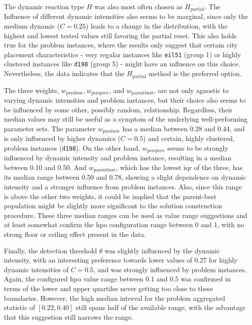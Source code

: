 The dynamic reaction type $H$ was also most often chosen as $H_\text{partial}$. The Influence of different dynamic intensities also seems to be marginal, since only the medium dynamic ($C=0.25$) leads to a change in the distribution, with the highest and lowest tested values still favoring the partial reset. This also holds true for the problem instances, where the results only suggest that certain city placement characteristics - very regular instances like \texttt{eil51} (group 1) or highly clustered instances like \texttt{d198} (group 5) - might have an influence on this choice. Nevertheless, the data indicates that the $H_\text{partial}$ method is the preferred option.

The three weights, $w_{\text{persbest}}, w_{\text{persprev}}$, and $w_{\text{parentbest}}$, are not only agnostic to varying dynamic intensities and problem instances, but their choice also seems to be influenced by some other, possibly random, relationship. Regardless, their median values may still be useful as a symptom of the underlying well-performing parameter sets. The parameter $w_{\text{persbest}}$ has a median between 0.28 and 0.44, and is only influenced by higher dynamics ($C=0.5$) and certain, highly clustered, problem instances (\texttt{d198}). On the other hand, $w_{\text{persprev}}$ seems to be strongly influenced by dynamic intensity and problem instance, resulting in a median between 0.10 and 0.50. And $w_{\text{parentbest}}$, which has the lowest \gls{iqr} of the three, has its median range between 0.50 and 0.78, showing a slight dependence on dynamic intensity and a stronger influence from problem instances. Also, since this range is above the other two weights, it could be implied that the parent-best population might be slightly more significant to the solution construction procedure. These three median ranges can be used as value range suggestions and at least somewhat confirm the \gls{hpo} configuration range between 0 and 1, with no strong floor or ceiling effect present in the data.  

Finally, the detection threshold $\theta$ was slightly influenced by the dynamic intensity, with an interesting preference towards lower values of 0.27 for highly dynamic intensities of $C=0.5$, and was strongly influenced by problem instances. Again, the configured \gls{hpo} value range between 0.1 and 0.5 was confirmed in terms of the lower and upper quartiles never getting too close to these boundaries. However, the high median interval for the problem aggregated statistic of $[0.22, 0.40]$ still spans half of the available range, with the advantage that this suggestion still narrows the range.

